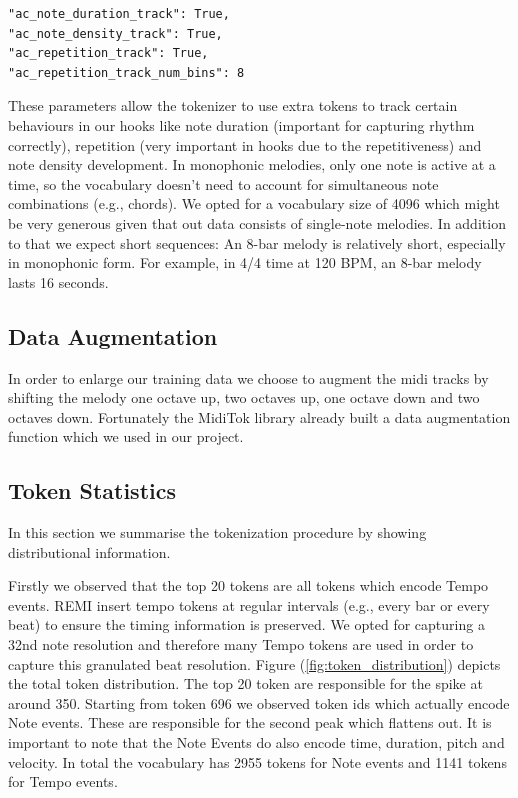 \documentclass[a4paper,12pt]{extarticle}
\begin{document}
\begin{lstlisting}
"ac_note_duration_track": True,
"ac_note_density_track": True,
"ac_repetition_track": True,
"ac_repetition_track_num_bins": 8
\end{lstlisting}
These parameters allow the tokenizer to use extra tokens to track certain behaviours in our hooks like note duration (important for capturing rhythm correctly), repetition (very important in hooks due to the repetitiveness) and note density development.
In monophonic melodies, only one note is active at a time, so the vocabulary doesn’t need to account for simultaneous note combinations (e.g., chords).
We opted for a vocabulary size of 4096 which might be very generous given that out data consists of single-note melodies.
In addition to that we expect short sequences: An 8-bar melody is relatively short, especially in monophonic form. For example, in 4/4 time at 120 BPM, an 8-bar melody lasts 16 seconds.

\subsection{Data Augmentation}
In order to enlarge our training data we choose to augment the midi tracks by shifting the melody one octave up, two octaves up, one octave down and two octaves down. Fortunately the MidiTok library already built a data augmentation function which we used in our project.
\subsection{Token Statistics}
\label{sec:token_stats}
In this section we summarise the tokenization procedure by showing distributional information. \newline

Firstly we observed that the top 20 tokens are all tokens which encode Tempo events.
REMI insert tempo tokens at regular intervals (e.g., every bar or every beat) to ensure the timing information is preserved.
We opted for capturing a 32nd note resolution and therefore many Tempo tokens are used in order to capture this granulated beat resolution.
Figure (\ref{fig:token_distribution}) depicts the total token distribution. The top 20 token are responsible for the spike at around 350. Starting from token 696 we observed token ids which actually encode Note events. These are responsible for the second peak which flattens out.
It is important to note that the Note Events do also encode time, duration, pitch and velocity. In total the vocabulary has 2955 tokens for Note events and 1141 tokens for Tempo events.
\end{document}
